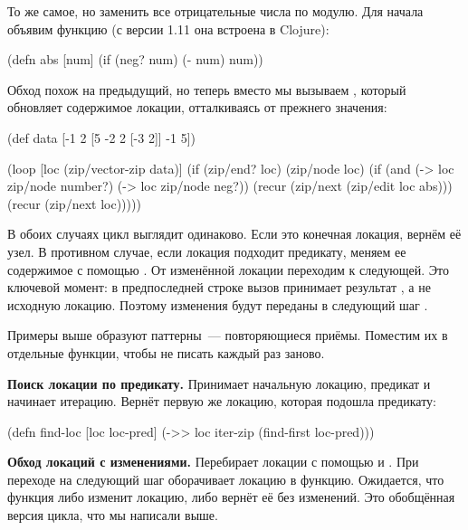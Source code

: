 То же самое, но заменить все отрицательные числа по модулю. Для начала объявим
функцию  (с версии 1.11 она встроена в Clojure):

\begin{english}
  \begin{clojure}
(defn abs
  [num]
  (if (neg? num)
    (- num)
    num))
  \end{clojure}
\end{english}

Обход похож на предыдущий, но теперь вместо  мы вызываем
, который обновляет содержимое локации, отталкиваясь от прежнего
значения:

\begin{english}
  \begin{clojure}
(def data
  [-1 2 [5 -2 2 [-3 2]] -1 5])

(loop [loc (zip/vector-zip data)]
  (if (zip/end? loc)
    (zip/node loc)
    (if (and (-> loc zip/node number?)
             (-> loc zip/node neg?))
      (recur (zip/next (zip/edit loc abs)))
      (recur (zip/next loc)))))
  \end{clojure}
\end{english}

В обоих случаях цикл выглядит одинаково. Если это конечная локация, вернём её
узел. В противном случае, если локация подходит предикату, меняем ее содержимое
с помощью . От изменённой локации переходим к следующей. Это ключевой
момент: в предпоследней строке вызов  принимает результат ,
а не исходную локацию. Поэтому изменения будут переданы в следующий шаг .

Примеры выше образуют паттерны~--- повторяющиеся приёмы. Поместим их в отдельные
функции, чтобы не писать каждый раз заново.


\textbf{Поиск локации по предикату.} Принимает начальную локацию, предикат и
начинает итерацию. Вернёт первую же локацию, которая подошла предикату:

\begin{english}
  \begin{clojure}
(defn find-loc [loc loc-pred]
  (->> loc
       iter-zip
       (find-first loc-pred)))
  \end{clojure}
\end{english}

\textbf{Обход локаций с изменениями.} Перебирает локации с помощью  и
. При переходе на следующий шаг оборачивает локацию в
функцию. Ожидается, что функция либо изменит локацию, либо вернёт её без
изменений. Это обобщённая версия цикла, что мы написали выше.

